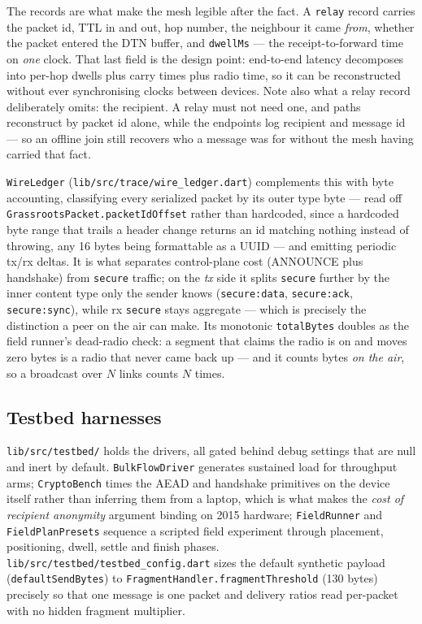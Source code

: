 \documentclass[11pt]{report}
\newcommand{\code}[1]{\texttt{\small #1}}
\begin{document}
The records are what make the mesh legible after the fact. A \code{relay} record carries the packet id, TTL in and out, hop number, the neighbour it came \emph{from}, whether the packet entered the DTN buffer, and \code{dwellMs} --- the receipt-to-forward time on \emph{one} clock. That last field is the design point: end-to-end latency decomposes into per-hop dwells plus carry times plus radio time, so it can be reconstructed without ever synchronising clocks between devices. Note also what a relay record deliberately omits: the recipient. A relay must not need one, and paths reconstruct by packet id alone, while the endpoints log recipient and message id --- so an offline join still recovers who a message was for without the mesh having carried that fact.

\code{WireLedger} (\code{lib/src/trace/wire_ledger.dart}) complements this with byte accounting, classifying every serialized packet by its outer type byte --- read off \code{GrassrootsPacket.packetIdOffset} rather than hardcoded, since a hardcoded byte range that trails a header change returns an id matching nothing instead of throwing, any 16 bytes being formattable as a UUID --- and emitting periodic tx/rx deltas. It is what separates control-plane cost (ANNOUNCE plus handshake) from \code{secure} traffic; on the \emph{tx} side it splits \code{secure} further by the inner content type only the sender knows (\code{secure:data}, \code{secure:ack}, \code{secure:sync}), while rx \code{secure} stays aggregate --- which is precisely the distinction a peer on the air can make. Its monotonic \code{totalBytes} doubles as the field runner's dead-radio check: a segment that claims the radio is on and moves zero bytes is a radio that never came back up --- and it counts bytes \emph{on the air}, so a broadcast over $N$ links counts $N$ times.

\subsection{Testbed harnesses}

\code{lib/src/testbed/} holds the drivers, all gated behind debug settings that are null and inert by default. \code{BulkFlowDriver} generates sustained load for throughput arms; \code{CryptoBench} times the AEAD and handshake primitives on the device itself rather than inferring them from a laptop, which is what makes the \emph{cost of recipient anonymity} argument binding on 2015 hardware; \code{FieldRunner} and \code{FieldPlanPresets} sequence a scripted field experiment through placement, positioning, dwell, settle and finish phases. \code{lib/src/testbed/testbed\_config.dart} sizes the default synthetic payload (\code{defaultSendBytes}) to \code{FragmentHandler.fragmentThreshold} (130 bytes) precisely so that one message is one packet and delivery ratios read per-packet with no hidden fragment multiplier.
\end{document}
